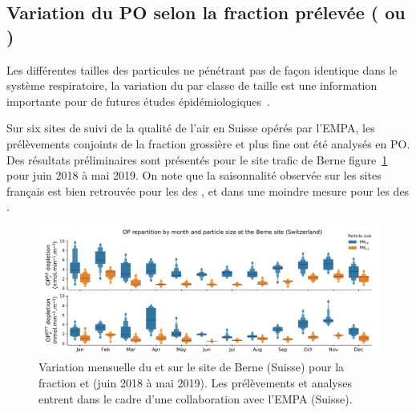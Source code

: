 \subsection{Variation du PO selon la fraction prélevée (\PMdix{} ou \PMdc)}%
\label{sub:pm10_pm2_5}

Les différentes tailles des particules ne pénétrant pas de façon identique dans le système
respiratoire, la variation du \POv{} par classe de taille est une information importante
pour de futures études épidémiologiques~\parencite{fangOxidative2019}.

Sur six sites de suivi de la qualité de l'air en Suisse opérés par l'EMPA, les prélèvements
conjoints de la fraction grossière \PMdix{} et plus fine \PMdc{} ont été analysés en PO.
Des résultats préliminaires sont présentés pour le site trafic de Berne
figure~\ref{fig:PO_berne} pour juin 2018 à mai 2019.  On note que la saisonnalité observée
sur les sites français est bien retrouvée pour les \POv{} des \PMdix, et dans une moindre
mesure pour les \POv{} des \PMdc.

\begin{figure}[ht]
    \centering
    \includegraphics[width=1.0\linewidth]{figures/chapter04/PO_berne.pdf}
    \caption{Variation mensuelle du \POAAv{} et \PODTTv{} sur le site de Berne (Suisse)
    pour la fraction \PMdix{} et \PMdc{} (juin 2018 à mai 2019).  Les prélèvements et
analyses entrent dans le cadre d'une collaboration avec l'EMPA (Suisse).}%
    \label{fig:PO_berne}
\end{figure}


